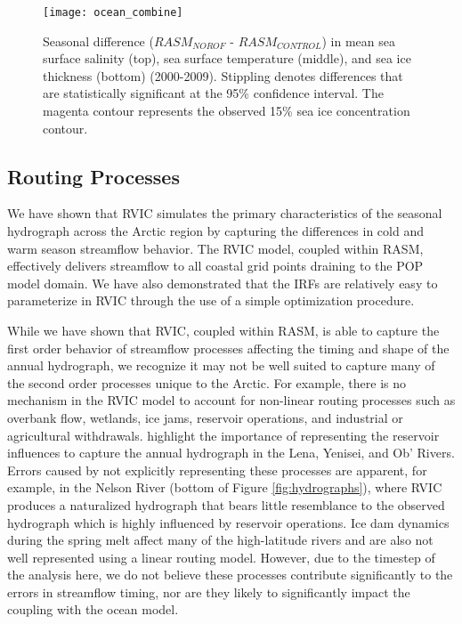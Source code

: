 \begin{figure}
    \centering
\texttt{[image: ocean\_combine]}
\caption{Seasonal difference ($RASM_{NOROF}$ - $RASM_{CONTROL}$) in mean sea surface salinity (top), sea surface temperature (middle), and sea ice thickness (bottom) (2000-2009). Stippling denotes differences that are statistically significant at the 95\%  confidence interval. The magenta contour represents the observed 15\% sea ice concentration contour. }
\label{fig:ocean_maps}
\end{figure}

\subsection{Routing Processes}

We have shown that RVIC simulates the primary characteristics of the seasonal hydrograph across the Arctic region by capturing the differences in cold and warm season streamflow behavior.
The RVIC model, coupled within RASM, effectively delivers streamflow to all coastal grid points draining to the POP model domain.
We have also demonstrated that the IRFs are relatively easy to parameterize in RVIC through the use of a simple optimization procedure.

While we have shown that RVIC, coupled within RASM, is able to capture the first order behavior of streamflow processes affecting the timing and shape of the annual hydrograph, we recognize it may not be well suited to capture many of the second order processes unique to the Arctic.
For example, there is no mechanism in the RVIC model to account for non-linear routing processes such as overbank flow, wetlands, ice jams, reservoir operations, and industrial or agricultural withdrawals.
\citet{Adam_2007} highlight the importance of representing the reservoir influences to capture the annual hydrograph in the Lena, Yenisei, and Ob' Rivers.
Errors caused by not explicitly representing these processes are apparent, for example, in the Nelson River (bottom of Figure \ref{fig:hydrographs}), where RVIC produces a naturalized hydrograph that bears little resemblance to the observed hydrograph which is highly influenced by reservoir operations.
Ice dam dynamics during the spring melt affect many of the high-latitude rivers and are also not well represented using a linear routing model.
However, due to the timestep of the analysis here, we do not believe these processes contribute significantly to the errors in streamflow timing, nor are they likely to significantly impact the coupling with the ocean model.

